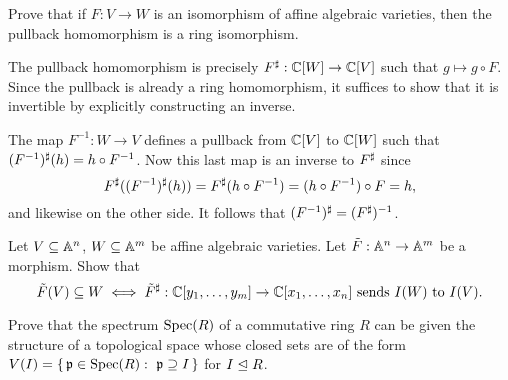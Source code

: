 \documentclass[12pt]{memoir}
\begin{document}
\begin{Ej}
  Prove that if $F : V \to W$ is an isomorphism of affine algebraic varieties, then the pullback homomorphism is a ring isomorphism.
\end{Ej}

\begin{ptcbr}
  The pullback homomorphism is precisely $F^\sharp:\mathbb{C}[W]\to\mathbb{C}[V]$ such that $g\mapsto g\circ F$. Since the pullback is already a ring homomorphism, it suffices to show that it is invertible by explicitly constructing an inverse.\par 
  The map $F^{-1}:W\to V$ defines a pullback from $\mathbb{C}[V]$ to $\mathbb{C}[W]$ such that $(F^{-1})^\sharp(h)=h\circ F^{-1}$. Now this last map is an inverse to $F^{\sharp}$ since 
  $$F^\sharp((F^{-1})^\sharp(h))=F^\sharp(h\circ F^{-1})=(h\circ F^{-1})\circ F=h,$$
  and likewise on the other side. It follows that $(F^{-1})^\sharp=(F^\sharp)^{-1}$.
\end{ptcbr}

\begin{Ej}
  Let $V\subseteq \mathbb{A}^n$, $W\subseteq \mathbb{A}^m$ be affine algebraic varieties. Let $\tilde{F}:\mathbb{A}^n\to\mathbb{A}^m$ be a morphism. Show that 
  $$\tilde{F}(V)\subseteq W\iff \tilde{F}^\sharp:\mathbb{C}[y_1,\dots,y_m]\to\mathbb{C}[x_1,\dots,x_n]\ \text{sends } I(W)\ \text{to } I(V).$$
\end{Ej}

\begin{Ej}[2.6.1]
  Prove that the spectrum $\operatorname{Spec}(R)$ of a commutative ring $R$ can be given the structure of a topological space whose closed sets are of the form $V(I)=\set{\lie p\in\Spec(R):\ \lie p\supseteq I}$ for $I\trianglelefteq R$.
\end{Ej}
\end{document}
